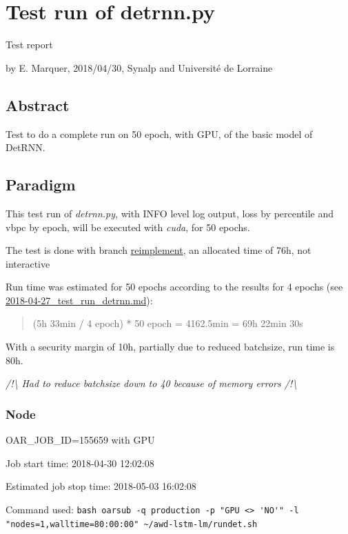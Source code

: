 \section*{Test run of detrnn.py}

Test report

by E. Marquer, 2018/04/30, Synalp and Université de Lorraine

\subsection{Abstract}

Test to do a complete run on 50 epoch, with GPU, of the basic model of
DetRNN.

\subsection{Paradigm}

This test run of \emph{detrnn.py}, with INFO level log output, loss by
percentile and vbpc by epoch, will be executed with \emph{cuda}, for 50
epochs.

The test is done with branch
\href{https://gitlab.inria.fr/emarquer/awd-lstm-lm/tree/reimplement}{reimplement},
an allocated time of 76h, not interactive

Run time was estimated for 50 epochs according to the results for 4
epochs (see
\href{https://gitlab.inria.fr/emarquer/awd-lstm-lm/blob/master/docsEsteban/testReports/2018-04-27_test_run_detrnn.md}{2018-04-27\_test\_run\_detrnn.md}):

\begin{quote}
(5h 33min / 4 epoch) * 50 epoch = 4162.5min = 69h 22min 30s
\end{quote}

With a security margin of 10h, partially due to reduced batchsize, run
time is 80h.

\emph{/!\textbackslash{} Had to reduce batchsize down to 40 because of
memory errors /!\textbackslash{}}

\subsubsection{Node}

OAR\_JOB\_ID=155659 with GPU

Job start time: 2018-04-30 12:02:08

Estimated job stop time: 2018-05-03 16:02:08

Command used:
\lstinline!bash oarsub -q production -p "GPU <> 'NO'" -l "nodes=1,walltime=80:00:00" ~/awd-lstm-lm/rundet.sh!

